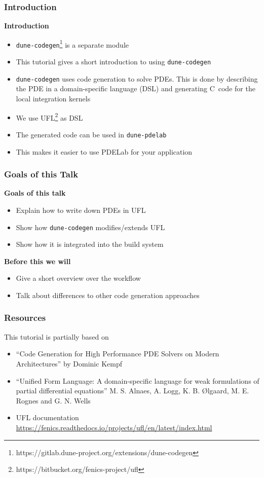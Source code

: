 \documentclass[aspectratio=169,11pt]{beamer}
\theoremstyle{definition}
\def\CC{{C\nolinebreak[4]\hspace{-.05em}\raisebox{.4ex}{\tiny\bf ++}}}
\begin{document}
\begin{frame}[fragile]
  \frametitle{Introduction}
  \textbf{Introduction}
  \begin{itemize}
    \item \lstinline{dune-codegen}\footnote{https://gitlab.dune-project.org/extensions/dune-codegen} is a separate module
  \item This tutorial gives a short introduction to using
    \lstinline{dune-codegen}
  \item \lstinline{dune-codegen} uses code generation to solve PDEs. This is
    done by describing the PDE in a domain-specific language (DSL) and
    generating \CC\ code for the local integration kernels
  \item We use UFL\footnote{https://bitbucket.org/fenics-project/ufl} as DSL
  \item The generated code can be used in \lstinline{dune-pdelab}
  \item This makes it easier to use PDELab for your application
  \end{itemize}
\end{frame}

\begin{frame}
  \frametitle{Goals of this Talk}

  \textbf{Goals of this talk}
  \begin{itemize}
  \item Explain how to write down PDEs in UFL
  \item Show how \lstinline{dune-codegen} modifies/extends UFL
  \item Show how it is integrated into the build system
  \end{itemize}
  \vfill
  \textbf{Before this we will}
  \begin{itemize}
  \item Give a short overview over the workflow
  \item Talk about differences to other code generation approaches
  \end{itemize}
\end{frame}

\begin{frame}
  \frametitle{Resources}
  This tutorial is partially based on
  \begin{itemize}
  \item ``Code Generation for High Performance PDE Solvers
    on Modern Architectures'' by Dominic Kempf
  \item ``Unified Form Language: A domain-specific language for weak
    formulations of partial differential equations'' M. S. Alnaes, A. Logg,
    K. B. Ølgaard, M. E. Rognes and G. N. Wells
  \item UFL documentation
    \url{https://fenics.readthedocs.io/projects/ufl/en/latest/index.html}
  \end{itemize}

\end{frame}
\end{document}
